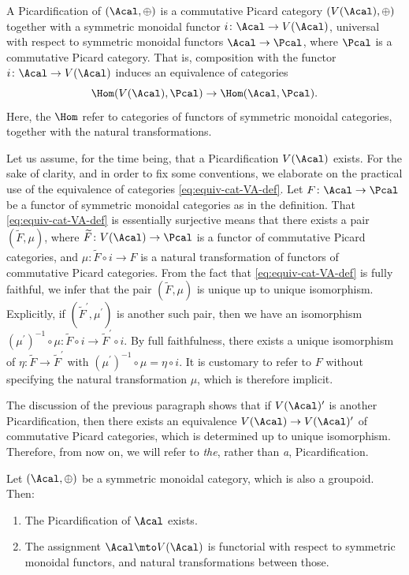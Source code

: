\begin{definition}\label{def:Picardification}
A Picardification of $(\Acal, \oplus)$ is a commutative Picard category $(V(\Acal), \oplus)$ together with a symmetric monoidal functor $i\colon\Acal\to V(\Acal)$, universal with respect to symmetric monoidal functors $\Acal \to \Pcal$, where $\Pcal$ is a commutative Picard category. That is, composition with the functor $i\colon \Acal\to V(\Acal)$ induces an equivalence of categories
\begin{equation}\label{eq:equiv-cat-VA-def}
\Hom(V(\Acal),\Pcal)\to\Hom(\Acal,\Pcal).
\end{equation}
Here, the $\Hom$ refer to categories of functors of symmetric monoidal categories, together with the natural transformations.
\end{definition}
Let us assume, for the time being, that a Picardification $V(\Acal)$ exists. For the sake of clarity, and in order to fix some conventions, we elaborate on the practical use of the equivalence of categories \eqref{eq:equiv-cat-VA-def}. Let $F\colon\Acal\to\Pcal$ be a functor of symmetric monoidal categories as in the definition. That \eqref{eq:equiv-cat-VA-def} is essentially surjective means that there exists a pair $(\widetilde{F},\mu)$, where $\widetilde{F}\colon V(\Acal)\to\Pcal$ is a functor of commutative Picard categories, and $\mu\colon \widetilde{F}\circ i\to F$ is a natural transformation of functors of commutative Picard categories. From the fact that \eqref{eq:equiv-cat-VA-def} is fully faithful, we infer that the pair $(\widetilde{F},\mu)$ is unique up to unique isomorphism. Explicitly, if $(\widetilde{F}^{\prime},\mu^{\prime})$ is another such pair, then we have an isomorphism $(\mu^{\prime})^{-1}\circ\mu\colon \widetilde{F}\circ i\to\widetilde{F}^{\prime}\circ i $. By full faithfulness, there exists a unique isomorphism of $\eta\colon\widetilde{F}\to\widetilde{F}^{\prime}$ with $(\mu^{\prime})^{-1}\circ\mu=\eta\circ i$. It is customary to refer to $F$ without specifying the natural transformation $\mu$, which is therefore implicit.

The discussion of the previous paragraph shows that if $V(\Acal)^{\prime}$ is another Picardification, then there exists an equivalence $V(\Acal)\to V(\Acal)^{\prime}$ of commutative Picard categories, which is determined up to unique isomorphism. Therefore, from now on, we will refer to \emph{the}, rather than \emph{a}, Picardification.

\begin{theorem}\label{thm:VA}
Let $(\Acal, \oplus)$ be a symmetric monoidal category, which is also a groupoid. Then:
\begin{enumerate}
\item The Picardification of $\Acal$ exists.
\item The assignment $\Acal\mto V(\Acal)$ is functorial with respect to symmetric monoidal functors, and natural transformations between those.
\end{enumerate}
\end{theorem}


